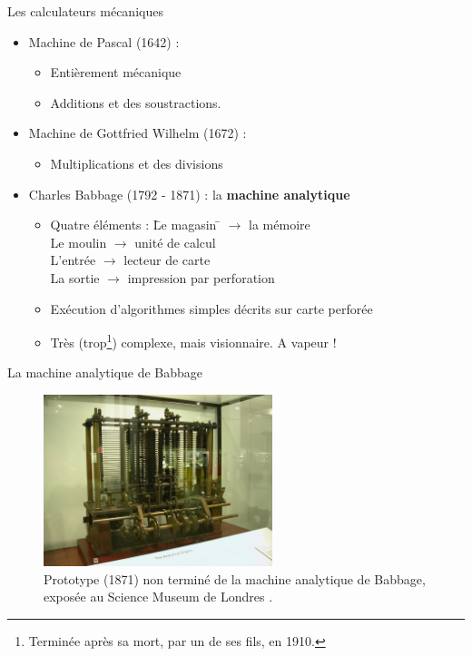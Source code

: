\begin{frame}{Les calculateurs mécaniques}
\begin{itemize}
\item <1> Machine de Pascal (1642) :
\begin{itemize}
\item Entièrement mécanique
\item Additions et des soustractions.
\end{itemize}
\item <2> Machine de Gottfried Wilhelm (1672) :
\begin{itemize}
\item Multiplications et des divisions
\end{itemize}
\item <3> Charles Babbage (1792 - 1871) : la \textbf{machine analytique}
\begin{itemize}
\item
\begin{tabbing}
Quatre éléments : \= Le magasin \= $\rightarrow$ la mémoire \\
\>Le moulin \> $\rightarrow$ unité de calcul \\
\>L'entrée \> $\rightarrow$ lecteur de carte \\
\>La sortie \> $\rightarrow$ impression par perforation
\end{tabbing}
\item Exécution d'algorithmes simples décrits sur carte perforée
\item Très (trop\footnote{Terminée après sa mort, par un de ses fils, en 1910.}) complexe, mais visionnaire. A vapeur !
\end{itemize}
\end{itemize}
\end{frame}

\begin{frame}{La machine analytique de Babbage}
\begin{figure}
\includegraphics[height=5cm]{../illustration/AnalyticalMachine_Babbage_London.jpg}
\caption{Prototype (1871) non terminé de la machine analytique de Babbage, exposée au Science Museum de Londres \cite{wp-mab}.}
\end{figure}
\end{frame}

